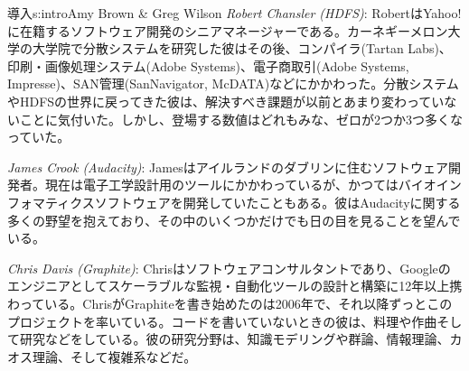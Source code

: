 \begin{aosachapter}{導入}{s:intro}{Amy Brown \& Greg Wilson}
\emph{Robert Chansler (HDFS)}: RobertはYahoo!に在籍するソフトウェア開発のシニアマネージャーである。カーネギーメロン大学の大学院で分散システムを研究した彼はその後、コンパイラ(Tartan Labs)、印刷・画像処理システム(Adobe Systems)、電子商取引(Adobe Systems, Impresse)、SAN管理(SanNavigator, McDATA)などにかかわった。分散システムやHDFSの世界に戻ってきた彼は、解決すべき課題が以前とあまり変わっていないことに気付いた。しかし、登場する数値はどれもみな、ゼロが2つか3つ多くなっていた。

\emph{James Crook (Audacity)}: Jamesはアイルランドのダブリンに住むソフトウェア開発者。現在は電子工学設計用のツールにかかわっているが、かつてはバイオインフォマティクスソフトウェアを開発していたこともある。彼はAudacityに関する多くの野望を抱えており、その中のいくつかだけでも日の目を見ることを望んでいる。


\emph{Chris Davis (Graphite)}: Chrisはソフトウェアコンサルタントであり、Googleのエンジニアとしてスケーラブルな監視・自動化ツールの設計と構築に12年以上携わっている。ChrisがGraphiteを書き始めたのは2006年で、それ以降ずっとこのプロジェクトを率いている。コードを書いていないときの彼は、料理や作曲そして研究などをしている。彼の研究分野は、知識モデリングや群論、情報理論、カオス理論、そして複雑系などだ。


\end{aosachapter}
